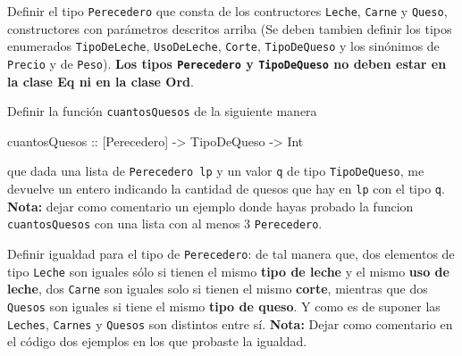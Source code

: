\documentclass{article}
\begin{document}
\begin{problem}{1}
    Definir el tipo \texttt{Perecedero} que consta de los contructores \texttt{Leche}, \texttt{Carne} y \texttt{Queso}, constructores con parámetros descritos arriba (Se deben tambien definir los tipos enumerados \texttt{TipoDeLeche}, \texttt{UsoDeLeche}, \texttt{Corte}, \texttt{TipoDeQueso} y los sinónimos de \texttt{Precio} y de \texttt{Peso}). \textbf{Los tipos \texttt{Perecedero} y \texttt{TipoDeQueso} no deben estar en la clase Eq ni en la clase Ord}.
\end{problem}
\begin{problem}{2}
    Definir la función \texttt{cuantosQuesos} de la siguiente manera
    \begin{haskell}
        cuantosQuesos :: [Perecedero] -> TipoDeQueso -> Int
    \end{haskell}
    que dada una lista de \texttt{Perecedero lp} y un valor \texttt{q} de tipo \texttt{TipoDeQueso}, me devuelve un entero indicando la cantidad de quesos que hay en \texttt{lp} con el tipo \texttt{q}.
    \textbf{Nota:} dejar como comentario un ejemplo donde hayas probado la funcion \texttt{cuantosQuesos} con una lista con al menos 3 \texttt{Perecedero}.
\end{problem}
\begin{problem}{3}
    Definir igualdad para el tipo de \texttt{Perecedero}: de tal manera que, dos elementos de tipo \texttt{Leche} son iguales sólo si tienen el mismo \textbf{tipo de leche} y el mismo \textbf{uso de leche}, dos \texttt{Carne} son iguales solo si tienen el mismo \textbf{corte}, mientras que dos \texttt{Quesos} son iguales si tiene el mismo \textbf{tipo de queso}. Y como es de suponer las \texttt{Leches}, \texttt{Carnes} y \texttt{Quesos} son distintos entre sí. \textbf{Nota:} Dejar como comentario en el código dos ejemplos en los que probaste la igualdad.
\end{problem}
\end{document}
